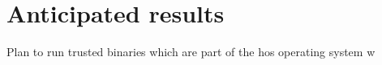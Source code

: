 \section{Anticipated results}
Plan to run trusted binaries which are part of the hos operating system w
